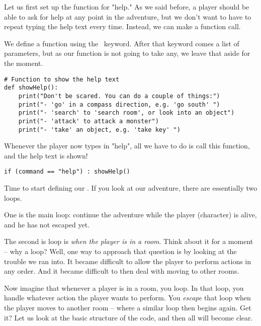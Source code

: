 Let us first set up the function for "help." As we said before, a player should be able to ask for help at any point in the adventure, but we don't want to have to repeat typing the help text every time. Instead, we can make a function call. 

We define a function using the \pythondef\ keyword. After that keyword comes a list of parameters, but as our function is not going to take any, we leave that aside for the moment. 

\begin{lstlisting}[firstnumber=last]
# Function to show the help text
def showHelp():
    print("Don't be scared. You can do a couple of things:")
    print("- 'go' in a compass direction, e.g. 'go south' ")
    print("- 'search' to 'search room', or look into an object")
    print("- 'attack' to attack a monster")
    print("- 'take' an object, e.g. 'take key' ")
\end{lstlisting}

Whenever the player now types in "help", all we have to do is call this function, and the help text is shown! 

\begin{verbatim}
if (command == "help") : showHelp()
\end{verbatim}

Time to start defining our . If you look at our adventure, there are essentially two loops. 

One is the main loop: continue the adventure while the player (character) is alive, and he has not escaped yet. 

The second is loop is \emph{when the player is in a room}. Think about it for a moment --  why a loop? Well, one way to approach that question is by looking at the trouble we ran into. It became difficult to allow the player to perform actions in any order. And it became difficult to then deal with moving to other rooms. 

Now imagine that whenever a player is in a room, you loop. In that loop, you handle whatever action the player wants to perform. You \emph{escape} that loop when the player moves to another room -- where a similar loop then begins again. Get it? Let us look at the basic structure of the code, and then all will become clear. 

